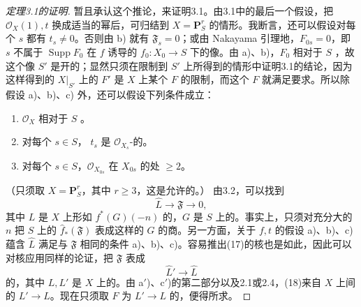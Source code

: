 \begin{proof}[定理3.1的证明]
暂且承认这个推论，来证明3.1。由3.1中的最后一个假设，把 $\mathcal O_X(1),t$ 换成适当的幂后，可归结到 $X=\mathbf P_S^r$ 的情形。我断言，还可以假设对每个 $s$ 都有 $t_s\neq0$。否则由 b) 就有 $\mathfrak F_s=0$；或由 Nakayama 引理地，$F_{0s}=0$，即 $s$ 不属于 $\operatorname{Supp}F_0$ 在 $f$ 诱导的 $f_0:X_0\to S$ 下的像。由 a)、b)，$F_0$ 相对于 $S$ ，故这个像 $S'$ 是开的；显然只须在限制到 $S'$ 上所得到的情形中证明3.1的结论，因为这样得到的 $X|_{S'}$ 上的 $F'$ 是 $X$ 上某个 $F$ 的限制，而这个 $F$ 就满足要求。所以除假设 a)、b)、c) 外，还可以假设下列条件成立：
\begin{enumerate}
\item[a$'$)] $\mathcal O_X$ 相对于 $S$ 。
\item[b$'$)] 对每个 $s\in S$， $t_s$ 是 $\mathcal O_{X_s}$-的。
\item[c$'$)] 对每个 $s\in S$，$\mathcal O_{X_{0s}}$ 在 $X_{0s}$ 的处 $\geq2$。
\end{enumerate}
（只须取 $X=\mathbf P_S^r$，其中 $r\geq3$，这是允许的。）
由3.2，可以找到
\[
 \widehat L\longrightarrow\mathfrak F\longrightarrow0,\tag{17}
\]
其中 $L$ 是 $X$ 上形如 $f^*(G)(-n)$ 的，$G$ 是 $S$ 上的。事实上，只须对充分大的 $n$ 把 $S$ 上的 $\widehat f_*(\mathfrak F)$ 表成这样的 $G$ 的商。另一方面，关于 $f,t$ 的假设 a)、b)、c) 蕴含 $\widehat L$ 满足与 $\mathfrak F$ 相同的条件 a)、b)、c)。容易推出(17)的核也是如此，因此可以对核应用同样的论证，把 $\mathfrak F$ 表成
\[
 \widehat L'\longrightarrow\widehat L\tag{18}
\]
的，其中 $L,L'$ 是 $X$ 上的。由 a$'$)、c$'$)的第二部分以及2.1或2.4，(18)来自 $X$ 上间的 $L'\to L$。现在只须取 $F$ 为 $L'\to L$ 的，便得所求。
\end{proof}
